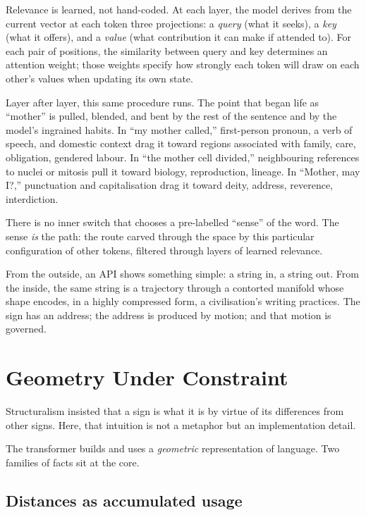 \documentclass[12pt,a4paper]{article}
\begin{document}
Relevance is learned, not hand-coded. At each layer, the model derives from the current vector at each token three projections: a \emph{query} (what it seeks), a \emph{key} (what it offers), and a \emph{value} (what contribution it can make if attended to). For each pair of positions, the similarity between query and key determines an attention weight; those weights specify how strongly each token will draw on each other's values when updating its own state.

Layer after layer, this same procedure runs. The point that began life as ``mother'' is pulled, blended, and bent by the rest of the sentence and by the model's ingrained habits. In ``my mother called,'' first-person pronoun, a verb of speech, and domestic context drag it toward regions associated with family, care, obligation, gendered labour. In ``the mother cell divided,'' neighbouring references to nuclei or mitosis pull it toward biology, reproduction, lineage. In ``Mother, may I?,'' punctuation and capitalisation drag it toward deity, address, reverence, interdiction.

There is no inner switch that chooses a pre-labelled ``sense'' of the word. The sense \emph{is} the path: the route carved through the space by this particular configuration of other tokens, filtered through layers of learned relevance.

From the outside, an API shows something simple: a string in, a string out. From the inside, the same string is a trajectory through a contorted manifold whose shape encodes, in a highly compressed form, a civilisation's writing practices. The sign has an address; the address is produced by motion; and that motion is governed.

\section{Geometry Under Constraint}

Structuralism insisted that a sign is what it is by virtue of its differences from other signs. Here, that intuition is not a metaphor but an implementation detail.

The transformer builds and uses a \emph{geometric} representation of language. Two families of facts sit at the core.

\subsection*{Distances as accumulated usage}
\end{document}
